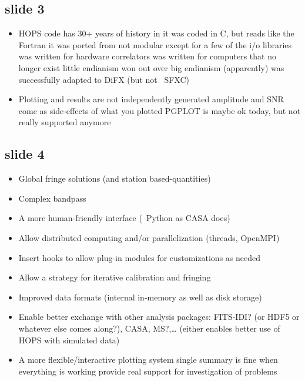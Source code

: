 \subsection{slide 3}
\begin{itemize}
\item \ac{HOPS} code has 30+ years of history in it
\sbitem was coded in \ac{C}, but reads like the \ac{Fortran} it was ported from
\sbitem not modular except for a few of the \ac{i/o} libraries
\sbitem was written for hardware correlators
\sbitem was written for computers that no longer exist
\sbitem little endianism won out over big endianism (apparently)
\sbitem was successfully adapted to \ac{DiFX}
(but not \eg~\ac{SFXC})
\item Plotting and results are not independently generated
\sbitem amplitude and \ac{SNR} come as side-effects of what you plotted
\sbitem \ac{PGPLOT} is maybe ok today, but not really supported anymore
\end{itemize}

\subsection{slide 4}
\begin{itemize}
\item Global fringe solutions (and station based-quantities)
\item Complex bandpass
\item A more human-friendly interface (\eg~\acs{Python} as \ac{CASA} does)
\item Allow distributed computing and/or parallelization (threads, OpenMPI)
\item Insert hooks to allow plug-in modules for customizations as needed
\item Allow a strategy for iterative calibration and fringing
\item Improved data formats (internal in-memory as well as disk storage)
\item Enable better exchange with other analysis packages:
\sbitem \ac{FITS-IDI}? (or \ac{HDF5} or whatever else comes along?),
\ac{CASA},
\ac{MS}?,\ldots
\sbitem (either enables better use of \ac{HOPS} with simulated data)
\item A more flexible/interactive plotting system
\sbitem single summary is fine when everything is working
\sbitem provide real support for investigation of problems
\end{itemize}


